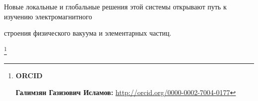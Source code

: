 Новые локальные и глобальные решения этой системы открывают путь к изучению электромагнитного 

строения физического вакуума и элементарных частиц. 









\thanks{{\bf ORCID}



{\bf Галимзян Газизович Исламов:} \url{http://orcid.org/0000-0002-7004-0177}



}





\RusRef





